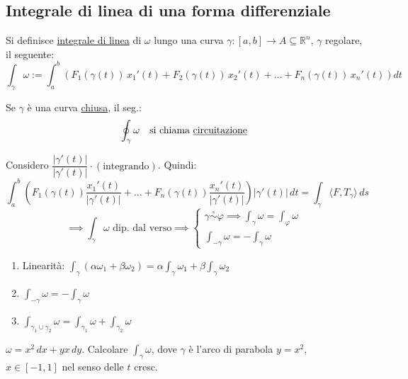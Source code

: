 \subsection{Integrale di linea di una forma differenziale}

\begin{definition}
Si definisce \underline{integrale di linea} di $\omega$ lungo una curva $\gamma : [a, b] \to A \subseteq \mathbb{R}^n$, $\gamma$ regolare, il seguente:
\[
\boxed{\int_\gamma \omega := \int_a^b \left( F_1(\gamma(t))\, x_1'(t) + F_2(\gamma(t))\, x_2'(t) + \dots + F_n(\gamma(t))\, x_n'(t) \right) dt}
\]

Se $\gamma$ è una curva \underline{chiusa}, il seg.:
\[
\oint_\gamma \omega \quad \text{si chiama \underline{circuitazione}}
\]
\end{definition}

Considero $\dfrac{|\gamma'(t)|}{|\gamma'(t)|} \cdot (\text{integrando})$. Quindi:
\[
\int_a^b \left( F_1(\gamma(t)) \frac{x_1'(t)}{|\gamma'(t)|} + \dots + F_n(\gamma(t)) \frac{x_n'(t)}{|\gamma'(t)|} \right) |\gamma'(t)|\, dt = \int_\gamma \langle F, T_\gamma \rangle\, ds
\]
\[
\implies \int_\gamma \omega \text{ dip. dal verso} \implies
\begin{cases}
\gamma \stackrel{\circ}{\sim} \varphi \implies \displaystyle\int_\gamma \omega = \int_\varphi \omega \\[8pt]
\displaystyle\int_{-\gamma} \omega = -\int_\gamma \omega
\end{cases}
\]

\begin{prop}[Proprietà]
\begin{enumerate}
    \item Linearità: $\displaystyle\int_\gamma (\alpha \omega_1 + \beta \omega_2) = \alpha \int_\gamma \omega_1 + \beta \int_\gamma \omega_2$
    \item $\displaystyle\int_{-\gamma} \omega = -\int_\gamma \omega$
    \item $\displaystyle\int_{\gamma_1 \cup \gamma_2} \omega = \int_{\gamma_1} \omega + \int_{\gamma_2} \omega$
\end{enumerate}
\end{prop}

\begin{esercizio}[EXE 1]
$\omega = x^2\, dx + yx\, dy$. Calcolare $\displaystyle\int_\gamma \omega$, dove $\gamma$ è l'arco di parabola $y = x^2$, $x \in [-1, 1]$ nel senso delle $t$ cresc.
\end{esercizio}

